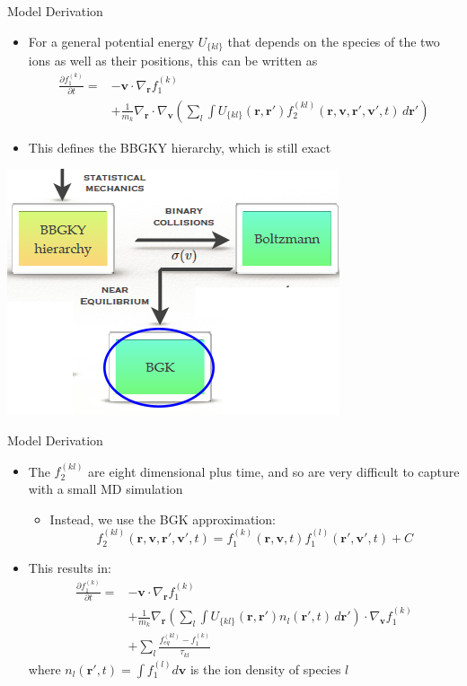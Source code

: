 \documentclass{beamer}
\begin{document}
		\begin{frame}{Model Derivation}
		\begin{itemize}
			\item  For a general potential energy $U_{\{kl\}}$ that depends on the species of the two ions as well as their positions, this can be written as
			\begin{align*}
			\frac{\partial f_1^{(k)}}{\partial t}=&-\mathbf{v}\cdot\nabla_\mathbf{r}f_1^{(k)}\\&+\frac{1}{m_k}\nabla_\mathbf{r}\cdot\nabla_\mathbf{v}\left(\sum_l\int U_{\{kl\}}(\mathbf{r},\mathbf{r}')f_{2}^{(kl)}(\mathbf{r},\mathbf{v},\mathbf{r}',\mathbf{v}',t)\,d\mathbf{r}'\right)
			\end{align*}
			\item This defines the BBGKY hierarchy, which is still exact		
			\vspace{0.25em}
		\end{itemize}
		\begin{center}
			\includegraphics[height=0.3\textwidth]{KT_structure_zoom.png}
		\end{center}
	\end{frame}
	
	\begin{frame}{Model Derivation}
	\begin{itemize}
	\item The $f_2^{(kl)}$ are eight dimensional plus time, and so are very difficult to capture with a small MD simulation
	\vspace{1em}
	\begin{itemize}
	\item Instead, we use the BGK approximation:
	\[f_2^{(kl)}(\mathbf{r},\mathbf{v},\mathbf{r}',\mathbf{v}',t)=f_1^{(k)}(\mathbf{r},\mathbf{v},t)f_1^{(l)}(\mathbf{r}',\mathbf{v}',t)+C
	\]
	\end{itemize}
	\item This results in:
			\begin{align*}
				\frac{\partial f_1^{(k)}}{\partial t}=&-\mathbf{v}\cdot\nabla_\mathbf{r}f_1^{(k)}\\&+\frac{1}{m_k}\nabla_\mathbf{r}\left(\sum_l\int U_{\{kl\}}(\mathbf{r},\mathbf{r}')n_l(\mathbf{r}',t)\,d\mathbf{r}'\right)\cdot\nabla_\mathbf{v}f_1^{(k)}\\&+\sum_l\frac{f_{eq}^{(kl)}-f_1^{(k)}}{\tau_{kl}}
			\end{align*}where $n_l(\mathbf{r}',t)=\int f_1^{(l)}d\mathbf{v}$ is the ion density of species $l$
			\end{itemize}
			\end{frame}
			
\end{document}
